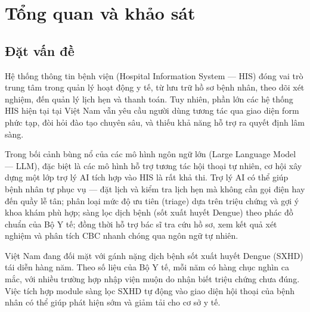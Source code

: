 \documentclass[a4paper,13pt,3p,twoside,openany]{report}
\theoremstyle{definition}
\theoremstyle{remark}
\theoremstyle{definition}
\let\ORIGsection\section
\renewcommand{\section}{\needspace{3\baselineskip}\ORIGsection}
\begin{document}
\clearpage
\null\thispagestyle{empty}\clearpage
{}
\pagestyle{fancy}
\fancyhf{}
\fancyhead[LE, RO]{\leftmark}   %
\fancyfoot[LE, RO]{\thepage}    %

\chapter{Tổng quan và khảo sát}

\section{Đặt vấn đề}

Hệ thống thông tin bệnh viện (Hospital Information System --- HIS) đóng vai trò trung tâm trong quản lý hoạt động y tế, từ lưu trữ hồ sơ bệnh nhân, theo dõi xét nghiệm, đến quản lý lịch hẹn và thanh toán. Tuy nhiên, phần lớn các hệ thống HIS hiện tại tại Việt Nam vẫn yêu cầu người dùng tương tác qua giao diện form phức tạp, đòi hỏi đào tạo chuyên sâu, và thiếu khả năng hỗ trợ ra quyết định lâm sàng.

Trong bối cảnh bùng nổ của các mô hình ngôn ngữ lớn (Large Language Model --- LLM), đặc biệt là các mô hình hỗ trợ tương tác hội thoại tự nhiên, cơ hội xây dựng một lớp trợ lý AI tích hợp vào HIS là rất khả thi. Trợ lý AI có thể giúp bệnh nhân tự phục vụ --- đặt lịch và kiểm tra lịch hẹn mà không cần gọi điện hay đến quầy lễ tân; phân loại mức độ ưu tiên (triage) dựa trên triệu chứng và gợi ý khoa khám phù hợp; sàng lọc dịch bệnh (sốt xuất huyết Dengue) theo phác đồ chuẩn của Bộ Y tế; đồng thời hỗ trợ bác sĩ tra cứu hồ sơ, xem kết quả xét nghiệm và phân tích CBC nhanh chóng qua ngôn ngữ tự nhiên.

Việt Nam đang đối mặt với gánh nặng dịch bệnh sốt xuất huyết Dengue (SXHD) tái diễn hàng năm. Theo số liệu của Bộ Y tế, mỗi năm có hàng chục nghìn ca mắc, với nhiều trường hợp nhập viện muộn do nhận biết triệu chứng chưa đúng. Việc tích hợp module sàng lọc SXHD tự động vào giao diện hội thoại của bệnh nhân có thể giúp phát hiện sớm và giảm tải cho cơ sở y tế.
\end{document}
